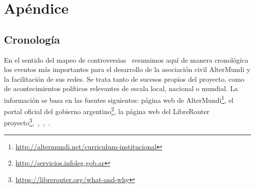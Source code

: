 \section*{Apéndice}

\subsection*{Cronología}

En el sentido del mapeo de controversias~\autocite{Venturini2010a} resumimos aquí de manera cronológica los eventos más importantes para el desarrollo de la asociación civil AlterMundi y la facilitación de sus redes.
Se trata tanto de sucesos propios del proyecto, como de acontecimientos políticos relevantes de escala local, nacional o mundial.
La información se basa en las fuentes siguientes: página web de AlterMundi\footnote{\url{http://altermundi.net/curriculum-institucional}}, el portal oficial del gobierno argentino\footnote{\url{http://servicios.infoleg.gob.ar}}, la página web del LibreRouter proyecto\footnote{\url{https://librerouter.org/what-and-why}},~\autocite{Piccoli2015},~\autocite{Brock2016},~\autocite{Vaseva2016a}.


